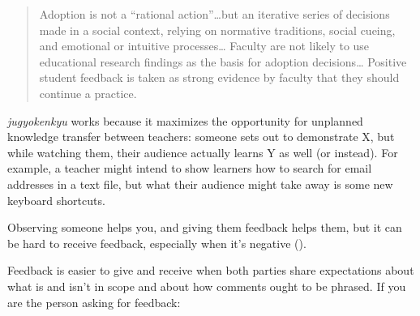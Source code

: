 \begin{quote}

  Adoption is not a ``rational action''{\ldots}but
  an iterative series of decisions made in a social context,
  relying on normative traditions, social cueing,
  and emotional or intuitive processes{\ldots}
  Faculty are not likely to use educational research findings
  as the basis for adoption decisions{\ldots}
  Positive student feedback is taken as strong evidence by faculty
  that they should continue a practice.

\end{quote}

\emph{jugyokenkyu} works because it maximizes the opportunity for unplanned knowledge transfer between teachers:
someone sets out to demonstrate X,
but while watching them,
their audience actually learns Y as well (or instead).
For example,
a teacher might intend to show learners how to search for email addresses in a text file,
but what their audience might take away is some new keyboard shortcuts.


Observing someone helps you,
and giving them feedback helps them,
but it can be hard to receive feedback,
especially when it's negative ().


Feedback is easier to give and receive when both parties share expectations
about what is and isn't in scope
and about how comments ought to be phrased.
If you are the person asking for feedback:

